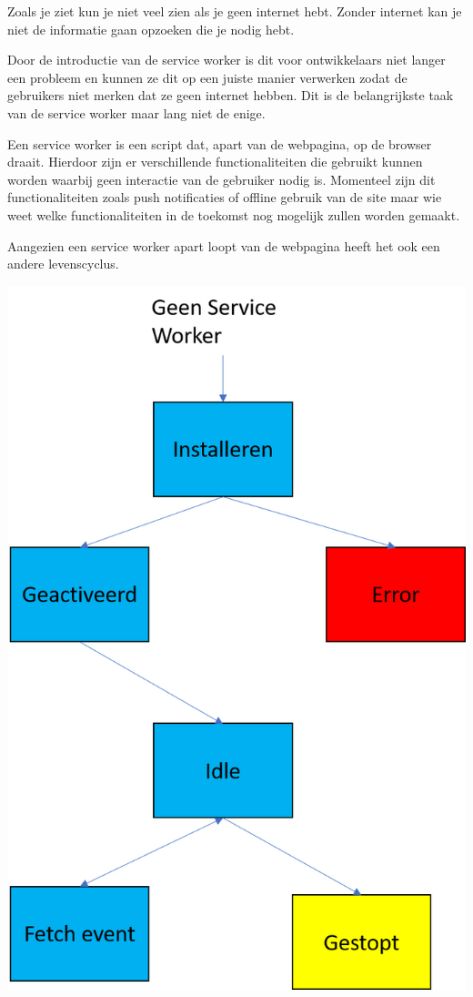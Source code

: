 Zoals je ziet kun je niet veel zien als je geen internet hebt. Zonder internet kan je niet de informatie gaan opzoeken die je nodig hebt.

Door de introductie van de service worker is dit voor ontwikkelaars niet langer een probleem en kunnen ze dit op een juiste manier verwerken zodat de gebruikers niet merken dat ze geen internet hebben. Dit is de belangrijkste taak van de service worker maar lang niet de enige.

Een service worker is een script dat, apart van de webpagina, op de browser draait. Hierdoor zijn er verschillende functionaliteiten die gebruikt kunnen worden waarbij geen interactie van de gebruiker nodig is. Momenteel zijn dit functionaliteiten zoals push notificaties of offline gebruik van de site maar wie weet welke functionaliteiten in de toekomst nog mogelijk zullen worden gemaakt. 


Aangezien een service worker apart loopt van de webpagina heeft het ook een andere levenscyclus. 

	\includegraphics[scale=0.5]{img/lifeCycle.png}
	
